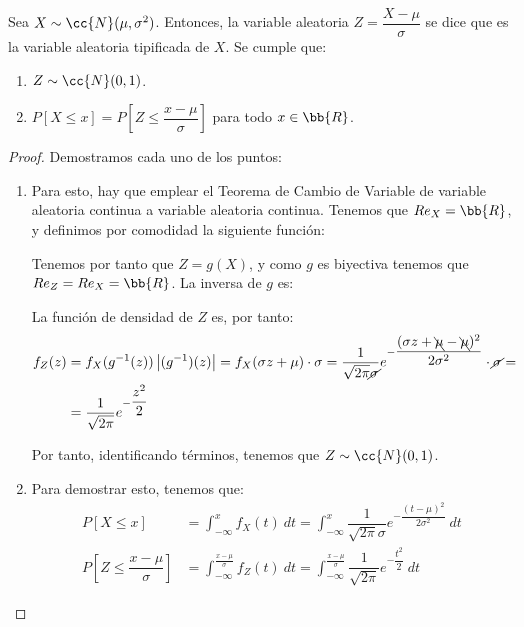 \begin{prop}
    Sea $X\sim \cc{N}(\mu,\sigma^2)$. Entonces, la variable aleatoria $Z = \dfrac{X-\mu}{\sigma}$ se dice que es la variable aleatoria tipificada de $X$.
    Se cumple que:
    \begin{enumerate}
        \item $Z\sim \cc{N}(0,1)$.
        \item $P[X\leq x] = P\left[Z\leq \dfrac{x-\mu}{\sigma}\right]$ para todo $x\in \bb{R}$.
    \end{enumerate}
\end{prop}
\begin{proof}
    Demostramos cada uno de los puntos:
    \begin{enumerate}
        \item Para esto, hay que emplear el Teorema de Cambio de Variable de
        variable aleatoria continua a variable aleatoria continua. Tenemos que $Re_X = \bb{R}$, y definimos por comodidad la siguiente función:

        Tenemos por tanto que $Z=g(X)$, y como $g$ es biyectiva tenemos que $Re_Z = Re_X = \bb{R}$.
        La inversa de $g$ es:

        La función de densidad de $Z$ es, por tanto:
        \begin{align*}
            f_Z(z) &= f_X(g^{-1}(z))\left|(g^{-1})(z)\right| = f_X(\sigma z + \mu)\cdot \sigma = \dfrac{1}{\sqrt{2\pi}\cancel{\sigma}}e^{-\dfrac{(\sigma z+\bcancel{\mu} -\bcancel{\mu})^2}{2\sigma^2}} \cdot \cancel{\sigma} =\\&= \dfrac{1}{\sqrt{2\pi}}e^{-\dfrac{z^2}{2}}
        \end{align*}

        Por tanto, identificando términos, tenemos que $Z\sim \cc{N}(0,1)$.

        \item Para demostrar esto, tenemos que:
        \begin{align*}
            P[X\leq x] &= \int_{-\infty}^{x} f_X(t)~dt = \int_{-\infty}^{x} \dfrac{1}{\sqrt{2\pi}\sigma} e^{-\dfrac{(t-\mu)^2}{2\sigma^2}}~dt \\
            P\left[Z\leq \dfrac{x-\mu}{\sigma}\right] &= \int_{-\infty}^{\frac{x-\mu}{\sigma}} f_Z(t)~dt = \int_{-\infty}^{\frac{x-\mu}{\sigma}} \dfrac{1}{\sqrt{2\pi}} e^{-\dfrac{t^2}{2}}~dt
        \end{align*}


\end{enumerate}
\end{proof}
